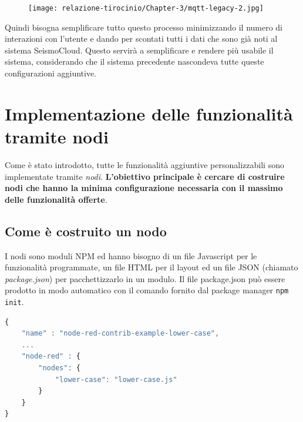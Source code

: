 \documentclass[a4paper,10pt]{memoir}
\begin{document}
\begin{figure}[hbt]
    \texttt{[image: relazione-tirocinio/Chapter-3/mqtt-legacy-2.jpg]}
    \label{fig:mqtt-legacy-2}
\end{figure}

Quindi bisogna semplificare tutto questo processo minimizzando il numero di interazioni con l'utente e dando per scontati tutti i dati che sono già noti al sistema SeismoCloud.
Questo servirà a semplificare e rendere più usabile il sistema, considerando che il sistema precedente nascondeva tutte queste configurazioni aggiuntive.

\clearpage

\section{Implementazione delle funzionalità tramite nodi}

Come è stato introdotto, tutte le funzionalità aggiuntive personalizzabili sono implementate tramite \textit{nodi}.
\textbf{L'obiettivo principale è cercare di costruire nodi che hanno la minima configurazione necessaria con il massimo delle funzionalità offerte}. 

\subsection{Come è costruito un nodo}

I nodi sono moduli NPM ed hanno bisogno di un file Javascript per le funzionalità programmate, un file HTML per il layout ed un file JSON (chiamato \textit{package.json}) per pacchettizzarlo in un modulo.
Il file package.json può essere prodotto in modo automatico con il comando fornito dal package manager \texttt{npm init}.
\begin{lstlisting}[language=Javascript]
{
    "name" : "node-red-contrib-example-lower-case",
    ...
    "node-red" : {
        "nodes": {
            "lower-case": "lower-case.js"
        }
    }
}
\end{lstlisting}
\end{document}
